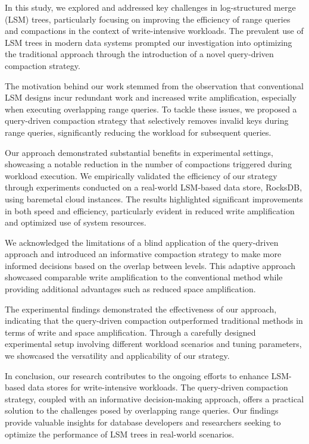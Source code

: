 In this study, we explored and addressed key challenges in log-structured merge (LSM) trees, particularly focusing on 
improving the efficiency of range queries and compactions in the context of write-intensive workloads. The prevalent use
of LSM trees in modern data systems prompted our investigation into optimizing the traditional approach through the 
introduction of a novel query-driven compaction strategy.

The motivation behind our work stemmed from the observation that conventional LSM designs incur redundant work and 
increased write amplification, especially when executing overlapping range queries. To tackle these issues, we proposed 
a query-driven compaction strategy that selectively removes invalid keys during range queries, significantly reducing 
the workload for subsequent queries.

Our approach demonstrated substantial benefits in experimental settings, showcasing a notable reduction in the number of 
compactions triggered during workload execution. We empirically validated the efficiency of our strategy through 
experiments conducted on a real-world LSM-based data store, RocksDB, using baremetal cloud instances. The results 
highlighted significant improvements in both speed and efficiency, particularly evident in reduced write amplification 
and optimized use of system resources.

We acknowledged the limitations of a blind application of the query-driven approach and introduced an informative 
compaction strategy to make more informed decisions based on the overlap between levels. This adaptive approach 
showcased comparable write amplification to the conventional method while providing additional advantages such as 
reduced space amplification.

The experimental findings demonstrated the effectiveness of our approach, indicating that the query-driven compaction 
outperformed traditional methods in terms of write and space amplification. Through a carefully designed experimental 
setup involving different workload scenarios and tuning parameters, we showcased the versatility and applicability of 
our strategy.

In conclusion, our research contributes to the ongoing efforts to enhance LSM-based data stores for write-intensive 
workloads. The query-driven compaction strategy, coupled with an informative decision-making approach, offers a 
practical solution to the challenges posed by overlapping range queries. Our findings provide valuable insights for 
database developers and researchers seeking to optimize the performance of LSM trees in real-world scenarios.